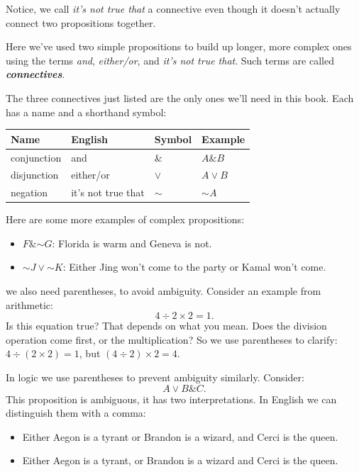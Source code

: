 \documentclass[justified]{tufte-book}
\providecommand{\tightlist}{%
  \setlength{\itemsep}{0pt}\setlength{\parskip}{0pt}}
\renewcommand{\neg}{\mathbin{\sim}}
\renewcommand{\wedge}{\mathbin{\&}}
\theoremstyle{definition}
\theoremstyle{definition}
\theoremstyle{definition}
\theoremstyle{definition}
\theoremstyle{remark}
\begin{document}
\begin{marginfigure}
Notice, we call \emph{it's not true that} a connective even though it
doesn't actually connect two propositions together.
\end{marginfigure}

Here we've used two simple propositions to build up longer, more complex ones using the terms \emph{and}, \emph{either/or}, and \emph{it's not true that}. Such terms are called \textbf{\emph{connectives}}.

The three connectives just listed are the only ones we'll need in this book. Each has a name and a shorthand symbol:

\begin{longtable}[]{@{}llll@{}}
\toprule
Name & English & Symbol & Example \\
\midrule
\endhead
conjunction & and & \(\wedge\) & \(A \wedge B\) \\
disjunction & either/or & \(\vee\) & \(A \vee B\) \\
negation & it's not true that & \(\neg\) & \(\neg A\) \\
\bottomrule
\end{longtable}

Here are some more examples of complex propositions:

\begin{itemize}
\tightlist
\item
  \(F \wedge \neg G\): Florida is warm and Geneva is not.
\item
  \(\neg J \vee \neg K\): Either Jing won't come to the party or Kamal won't come.
\end{itemize}

 we also need parentheses, to avoid ambiguity. Consider an example from arithmetic:
\[ 4 \div 2 \times 2 = 1. \]
Is this equation true? That depends on what you mean. Does the division operation come first, or the multiplication? So we use parentheses to clarify: \(4 \div (2 \times 2) = 1\), but \((4 \div 2) \times 2 = 4\).

In logic we use parentheses to prevent ambiguity similarly. Consider:
\[ A \vee B \wedge C. \]
This proposition is ambiguous, it has two interpretations. In English we can distinguish them with a comma:

\begin{itemize}
\tightlist
\item
  Either Aegon is a tyrant or Brandon is a wizard, and Cerci is the queen.
\item
  Either Aegon is a tyrant, or Brandon is a wizard and Cerci is the queen.
\end{itemize}
\end{document}
